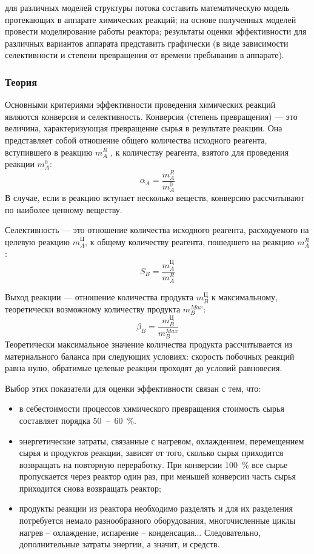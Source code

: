 
\goal для различных моделей структуры потока составить математическую модель протекающих в аппарате химических реакций; на основе полученных моделей провести моделирование работы реактора; результаты оценки эффективности для различных вариантов аппарата представить графически (в виде зависимости селективности и степени превращения от времени пребывания в аппарате).

\subsubsection{Теория}
Основными критериями эффективности проведения химических реакций являются конверсия и селективность. 
Конверсия (степень превращения) --- это величина, характеризующая превращение сырья в результате реакции. Она представляет собой отношение общего количества исходного реагента, вступившего в реакцию $m_A^R$ , к количеству реагента, взятого для проведения реакции $m_A^0$:
\begin{equation}\label{eq:rea.alpha}
	\alpha_A = \dfrac{m_A^R}{m_A^0}
\end{equation}
В случае, если в реакцию вступает несколько веществ, конверсию рассчитывают по наиболее ценному веществу.  

Селективность --- это отношение количества исходного реагента, расходуемого на целевую реакцию $m_A^Ц$, к общему количеству реагента, пошедшего на реакцию $m_A^R$:
\begin{equation}\label{eq:rea.s}
	S_B= \dfrac{m_A^Ц}{m_A^R}
\end{equation}

Выход реакции --- отношение количества продукта $m_B^Ц$ к максимальному, теоретически возможному количеству продукта $m_B^{Max}$:
\begin{equation}\label{eq:rea.beta}
	\beta_B=\dfrac{m_B^Ц}{m_B^{Max}}
\end{equation}
Теоретически максимальное значение количества продукта рассчитывается из материального баланса при следующих условиях: скорость побочных реакций равна нулю, обратимые целевые реакции проходят до условий равновесия.

Выбор этих показатели для оценки эффективности связан с тем, что:
\begin{itemize}
	\item в себестоимости процессов химического превращения стоимость сырья составляет порядка 50\ --\ 60\ \%.
	\item энергетические затраты, связанные с нагревом, охлаждением, перемещением сырья и продуктов реакции, зависят от того, сколько сырья приходится возвращать на повторную переработку. При конверсии 100\ \% все сырье пропускается через реактор один раз, при меньшей конверсии часть сырья приходится снова возвращать реактор;
	\item продукты реакции из реактора необходимо разделять и для их разделения потребуется немало разнообразного оборудования, многочисленные циклы нагрев -- охлаждение, испарение -- конденсация... Следовательно, дополнительные затраты энергии, а значит, и средств.
\end{itemize}

